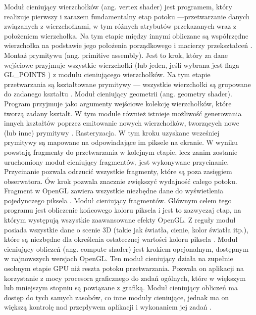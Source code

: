 \begin{itemize}

\itemi Moduł cieniujący wierzchołków (ang. vertex shader) jest programem, który realizuje pierwszy i zarazem fundamentalny etap potoku ---przetwarzanie danych związanych z wierzchołkami, w tym różnych atrybutów przekazanych wraz z położeniem wierzchołka. Na tym etapie między innymi obliczane są współrzędne wierzchołka na podstawie jego położenia porządkowego i macierzy przekształceń \cite{slownik}.
\itemi Montaż prymitywu (ang. primitive assembly). Jest to krok, który za dane wejściowe przyjmuje wszystkie wierzchołki (lub jeden, jeśli wybrana jest flaga GL\_POINTS ) z modułu cieniującego wierzchołków. Na tym etapie przetwarzania są kształtowane prymitywy --- wszystkie wierzchołki są grupowane do zadanego kształtu \cite{opengltutorial}.
\itemi Moduł cieniujący geometrii (ang. geometry shader). Program przyjmuje jako argumenty wejściowe kolekcję wierzchołków, które tworzą zadany kształt. W tym module również istnieje możliwość generowania innych kształtów poprzez emitowanie nowych wierzchołków, tworzących nowe (lub inne) prymitywy \cite{slownik}.
\itemi Rasteryzacja. W tym kroku uzyskane wcześniej prymitywy są mapowane na odpowiadające im piksele na ekranie. W wyniku powstają fragmenty do przetwarzania w kolejnym etapie, lecz zanim zostanie uruchomiony moduł cieniujący fragmentów, jest wykonywane przycinanie. Przycinanie pozwala odrzucić wszystkie fragmenty, które są poza zasięgiem obserwatora. Ów krok pozwala znacznie zwiększyć wydajność całego potoku. Fragment w OpenGL zawiera wszystkie niezbędne dane do wyświetlenia pojedynczego piksela \cite{slownik}.
\itemi Moduł cieniujący fragmentów. Głównym celem tego programu jest obliczenie końcowego koloru piksela i jest to zazwyczaj etap, na którym występują wszystkie zaawansowane efekty OpenGL. Z reguły moduł posiada wszystkie dane o scenie 3D (takie jak światła, cienie, kolor światła itp.), które są niezbędne dla określenia ostatecznej wartości koloru piksela \cite{slownik}.
\itemi Moduł cieniujący obliczeń (ang. compute shader) jest krokiem opcjonalnym, dostępnym w najnowszych wersjach OpenGL. Ten moduł cieniujący działa na zupełnie osobnym etapie GPU niż reszta potoku przetwarzania. Pozwala on aplikacji na korzystanie z mocy procesora graficznego do zadań ogólnych, które w większym lub mniejszym stopniu są powiązane z grafiką. Moduł cieniujący obliczeń ma dostęp do tych samych zasobów, co inne moduły cieniujące, jednak ma on większą kontrolę nad przepływem aplikacji i wykonaniem jej zadań \cite{OGlOfficialGuide}.
\end{itemize}


